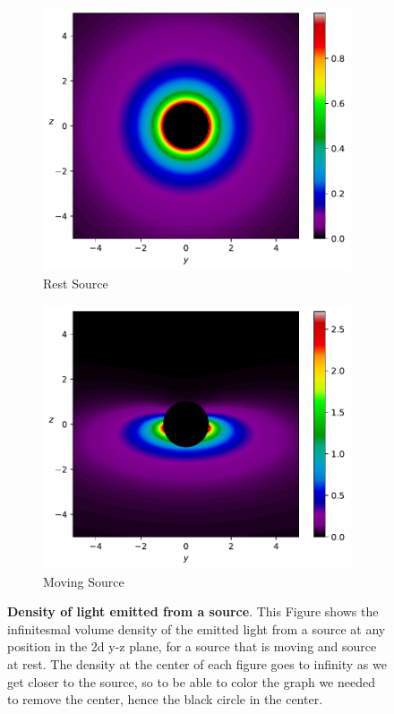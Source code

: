 \begin{figure}[H]
	\centering
	\begin{subfigure}{0.45\textwidth}
		\centering
		\includegraphics[width=\textwidth]{images/pdf/Density_of_Light_from_Rest_Source.pdf}
		\caption{Rest Source}
		\label{subfig_1: Density of light for surface element}
	\end{subfigure}
	\begin{subfigure}{0.45\textwidth}
		\centering
		\includegraphics[width=\textwidth]{images/pdf/Density_of_Light_from_Moving_Source.pdf}
		\caption{Moving Source}
		\label{subfig_2: Density of light for surface element}
	\end{subfigure}
	\caption{\textbf{Density of light emitted from a source}. This Figure shows the infinitesmal volume density of the emitted light from a source at any position in the 2d y-z plane, for a source that is moving and source at rest. The density at the center of each figure goes to infinity as we get closer to the source, so to be able to color the graph we needed to remove the center, hence the black circle in the center.}
	\label{fig: Density of light for surface element}
\end{figure}

